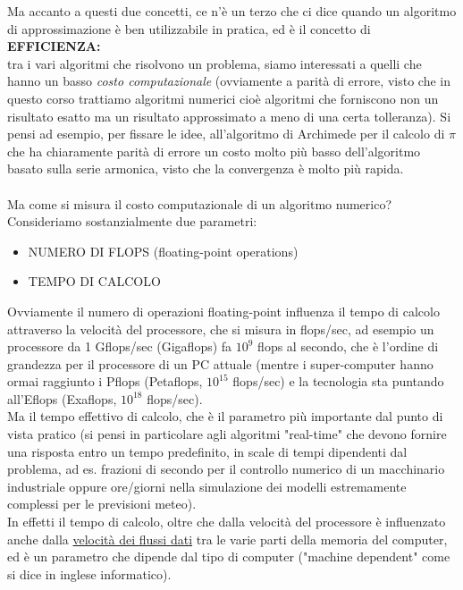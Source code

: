 \documentclass[12pt]{article}
\begin{document}
Ma accanto a questi due concetti, ce n'è un terzo che ci dice quando un algoritmo di approssimazione è ben utilizzabile in pratica, ed è il concetto di\\
\textbf{EFFICIENZA:}\\
tra i vari algoritmi che risolvono un problema, siamo interessati a quelli che hanno un basso \textit{costo computazionale} (ovviamente a parità di errore, visto che in questo corso trattiamo algoritmi numerici cioè algoritmi che forniscono non un risultato esatto ma un risultato approssimato a meno di una certa tolleranza). Si pensi ad esempio, per fissare le idee, all'algoritmo di Archimede per il calcolo di $\pi$ che ha chiaramente parità di errore un costo molto più basso dell'algoritmo basato sulla serie armonica, visto che la convergenza è molto più rapida.\\\\
Ma come si misura il costo computazionale di un algoritmo numerico?\\ Consideriamo sostanzialmente  due parametri:
\begin{itemize}
    \item NUMERO DI FLOPS (floating-point operations)
    \item TEMPO DI CALCOLO 
\end{itemize}
Ovviamente il numero di operazioni floating-point influenza il tempo di calcolo attraverso la velocità del processore, che si misura in flops/sec, ad esempio un processore da 1 Gflops/sec (Gigaflops) fa $10^9$ flops al secondo, che è l'ordine di grandezza per il processore di un PC attuale (mentre i super-computer hanno ormai raggiunto i Pflops (Petaflops, $10^{15}$ flops/sec) e la tecnologia sta puntando all'Eflops (Exaflops, $10^{18}$ flops/sec).\\ Ma il tempo effettivo di calcolo, che è il parametro più importante dal punto di vista pratico (si pensi in particolare agli algoritmi "real-time" che devono fornire una risposta entro un tempo predefinito, in scale di tempi dipendenti dal problema, ad es. frazioni di secondo per il controllo numerico di un macchinario industriale oppure ore/giorni nella simulazione dei modelli estremamente complessi per le previsioni meteo).\\ In effetti il tempo di calcolo, oltre che dalla velocità del processore è influenzato anche dalla \underline{velocità dei flussi dati} tra le varie parti della memoria del computer, ed è un parametro che dipende dal tipo di computer ("machine dependent" come si dice in inglese informatico).\\
\end{document}

